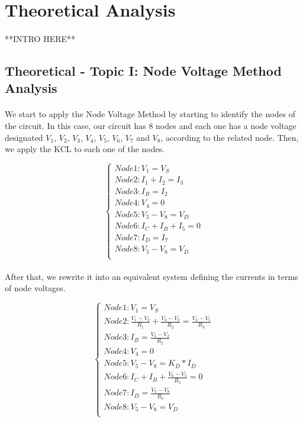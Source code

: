 \section{Theoretical Analysis}
\label{sec:analysis}

\paragraph{}
**INTRO HERE**


\subsection{Theoretical - Topic I: Node Voltage Method Analysis}
\label{subsec:first_topic}

\paragraph{}
We start to apply the Node Voltage Method by starting to identify the nodes of the circuit. In this case, our circuit has 8 nodes and each one has a node voltage designated $V_1$, $V_2$, $V_3$, $V_4$, $V_5$, $V_6$, $V_7$ and $V_8$, according to the related node. Then, we apply the KCL to each one of the nodes.

\[
\left\{\begin{matrix}
Node 1: V_1 = V_S\\
Node 2: I_1 + I_2 = I_3\\
Node 3: I_B = I_2\\
Node 4: V_4 = 0\\
Node 5: V_5 -V_8 = V_D\\
Node 6: I_C + I_B + I_5 = 0\\
Node 7: I_D = I_7\\
Node 8: V_5 -V_8 = V_D\\
\end{matrix}\right.
\]

\paragraph{}
After that, we rewrite it into an equivalent system defining the currents in terms of node voltages.

\[
\left\{\begin{matrix}
Node 1: V_1 = V_S\\
Node 2: \frac{V_1-V_2}{R_1} + \frac{V_3-V_2}{R_2} = \frac{V_2-V_5}{R_3}\\
Node 3: I_B = \frac{V_3-V_2}{R_2}\\
Node 4: V_4 = 0\\
Node 5: V_5 -V_8 = K_D*I_D\\
Node 6: I_C + I_B + \frac{V_6-V_5}{R_5} = 0\\
Node 7: I_D = \frac{V_7-V_8}{R_7}\\
Node 8: V_5 -V_8 = V_D\\
\end{matrix}\right.
\]

